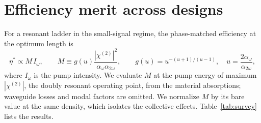 \documentclass[11pt]{article}
\newcommand{\chitwo}{\chi^{(2)}}
\newcommand{\aw}{\alpha_{\omega}}
\newcommand{\aww}{\alpha_{2\omega}}
\begin{document}
\section{Efficiency merit across designs}\label{sec:fom}
For a resonant ladder in the small-signal regime, the phase-matched efficiency at the optimum length is \cite{OwnbyNL02}
\begin{equation}
\eta^*\propto M\,I_\omega,\qquad M\equiv g(u)\frac{|\chitwo|^2}{\aw\aww},\qquad g(u)=u^{-(u+1)/(u-1)},\quad u=\frac{2\aw}{\aww},
\end{equation}
where $I_\omega$ is the pump intensity. We evaluate $M$ at the pump energy of maximum $|\chitwo|$, the doubly resonant operating point, from the material absorptions; waveguide losses and modal factors are omitted. We normalize $M$ by its bare value at the same density, which isolates the collective effects. Table~\ref{tab:survey} lists the results.
\end{document}
